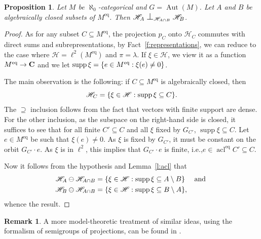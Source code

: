 \documentclass[11pt]{article}
\newcommand{\ie}{i.e.,\xspace}
\providecommand{\And}{}\numberwithin{equation}{section}
\let\mathcal\mathscr
\let\sub\subseteq
\theoremstyle{plain}
\newtheorem{prop}[theorem]{Proposition}
\theoremstyle{definition}
\newtheorem{remark}[theorem]{Remark}
\newcommand{\cH}{\mathcal{H}}
\DeclareMathOperator{\acl}{acl}
\DeclareMathOperator{\Aut}{Aut}
\DeclareMathOperator{\supp}{supp}
\DeclarePairedDelimiter\set{\{}{\}}
\newcommand{\eq}{^{\mathrm{eq}}}
\renewcommand{\And}{\text{ and }}
\newcommand{\Perp}[1][]{\mathrel{
\mathop{
\scalebox{1.3}{\text{$\perp$}}
}\displaylimits_{#1}}}
\begin{document}
\begin{prop}
\label{p:repr-independent}
Let $M$ be $\aleph_0$-categorical and $G = \Aut(M)$. Let $A$ and $B$ be algebraically closed subsets of $M\eq$. Then $\cH_{A} \Perp[\cH_{A \cap B}] \cH_{B}$.
\end{prop}
\begin{proof}
As for any subset $C \sub M\eq$, the projection $p_C$ onto $\cH_C$ commutes with
direct sums and subrepresentations, by Fact~\ref{f:representations}, we can reduce to the case where $\cH = \ell^2(M\eq)$ and $\pi = \lambda$. If $\xi \in \cH$, we view it as a function $M\eq \to \C$ and we let $\supp \xi = \set{e \in M\eq : \xi(e) \neq 0}$.

The main observation is the following: if $C \sub M\eq$ is algebraically closed, then
\begin{equation*}
\cH_C = \set{\xi \in \cH : \supp \xi \sub C }.
\end{equation*}
The $\supseteq$ inclusion follows from the fact that vectors with finite support are dense. For the other inclusion, as the subspace on the right-hand side is closed, it suffices to see that for all finite $C' \sub C$ and all $\xi$ fixed by $G_{C'}$, $\supp \xi \sub C$. Let $e \in M\eq$ be such that $\xi(e) \neq 0$. As $\xi$ is fixed by $G_{C'}$, it must be constant on the orbit $G_{C'} \cdot e$. As $\xi$ is in $\ell^2$, this implies that $G_{C'} \cdot e$ is finite, \ie $e \in \acl\eq C' \sub C$.

Now it follows from the hypothesis and Lemma~\ref{l:acl} that
\begin{align*}
\cH_A \ominus \cH_{A \cap B} &= \set{\xi \in \cH : \supp \xi \sub A \setminus B} \quad \And \\
\cH_B \ominus \cH_{A \cap B} &= \set{\xi \in \cH : \supp \xi \sub B \setminus A},
\end{align*}
whence the result.
\end{proof}
\begin{remark}
\label{rem:mt-approach}
A more model-theoretic treatment of similar ideas, using the formalism of semigroups of projections, can be found in \cite{BenYaacov2018}.
\end{remark}
\end{document}
